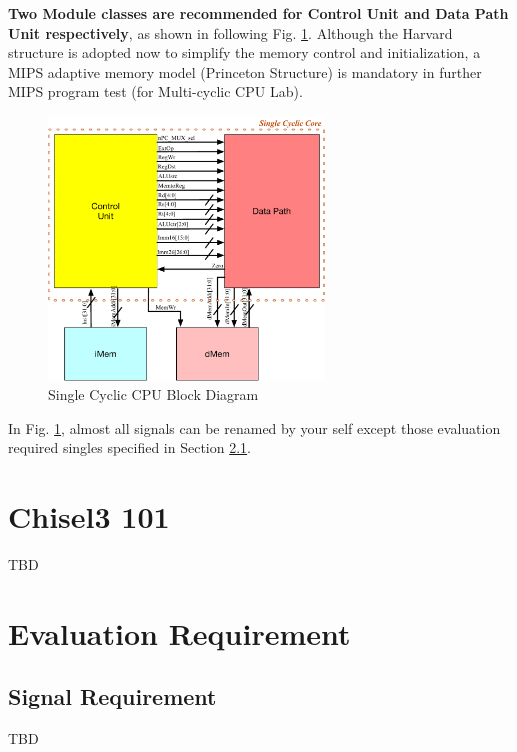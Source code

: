 \documentclass[a4paper]{article}
\begin{document}
\textbf{Two Module classes are recommended for Control Unit and Data Path Unit respectively}, as shown in following Fig. \ref{fig:modules}. Although the Harvard structure is adopted now to simplify the memory control and initialization, a MIPS adaptive memory model (Princeton Structure) is mandatory in further MIPS program test (for Multi-cyclic CPU Lab).  
\begin{figure}[ht]
 \centering
 \includegraphics[height=7cm]{images/l1modules.pdf}
 \caption{Single Cyclic CPU Block Diagram}
 \label{fig:modules}
\end{figure}
In Fig. \ref{fig:modules}, almost all signals can be renamed by your self except those evaluation required singles specified in Section \ref{sub:signal}.

\newpage
\section{Chisel3 101} \label{Datatypes}%
TBD
 

\newpage
\section{Evaluation Requirement} \label{sec:Functions}%
\subsection{Signal Requirement}\label{sub:signal}
TBD
\end{document}

